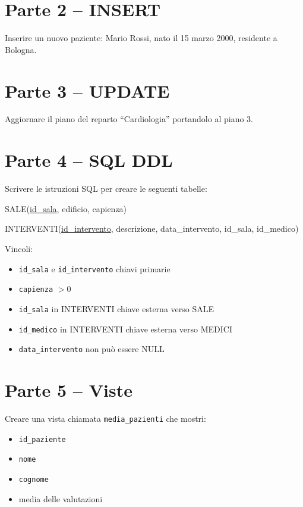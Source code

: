 \documentclass[a4paper,12pt]{article}
\begin{document}
	
	\section*{Parte 2 -- INSERT}
	
	Inserire un nuovo paziente:
	Mario Rossi, nato il 15 marzo 2000, residente a Bologna.
	
	
	\section*{Parte 3 -- UPDATE}
	
	Aggiornare il piano del reparto ``Cardiologia'' portandolo al piano 3.
	

\section*{Parte 4 -- SQL DDL}

Scrivere le istruzioni SQL per creare le seguenti tabelle:

SALE(\underline{id\_sala}, edificio, capienza)

INTERVENTI(\underline{id\_intervento}, descrizione,
data\_intervento, id\_sala, id\_medico)

Vincoli:
\begin{itemize}
	\item \texttt{id\_sala} e \texttt{id\_intervento} chiavi primarie
	\item \texttt{capienza} $> 0$
	\item \texttt{id\_sala} in INTERVENTI chiave esterna verso SALE
	\item \texttt{id\_medico} in INTERVENTI chiave esterna verso MEDICI
	\item \texttt{data\_intervento} non può essere NULL
\end{itemize}
		
	\section*{Parte 5 -- Viste}
	
	Creare una vista chiamata \texttt{media\_pazienti} che mostri:
	\begin{itemize}
		\item \texttt{id\_paziente}
		\item \texttt{nome}
		\item \texttt{cognome}
		\item media delle valutazioni
	\end{itemize}
	
\end{document}
